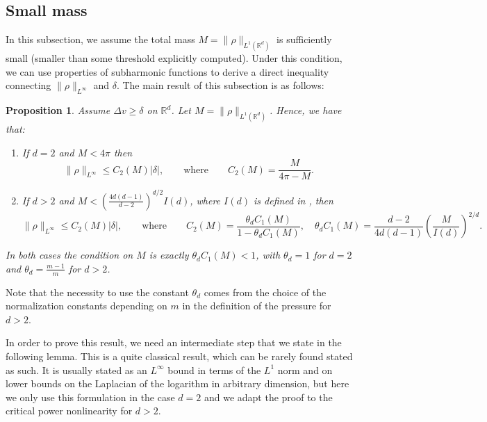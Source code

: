 \documentclass[11pt,a4paper]{article}
\numberwithin{equation}{section}
\theoremstyle{plain}
\newtheorem{proposition}[theorem]{Proposition}
\theoremstyle{remark}
\newcommand {\f}{\frac}
\begin{document}
\subsection{Small mass}

In this subsection, we assume the total mass $M = \|\rho\|_{L^1(\mathbb{R}^d)}$ is sufficiently small (smaller than some threshold explicitly computed). Under this condition, we can use properties of subharmonic functions to derive a direct inequality connecting $\|\rho\|_{L^\infty}$ and $\delta$. The main result of this subsection is as follows:

\begin{proposition}\label{prop:linf_very_small_mass}
Assume $\Delta v \ge \delta$ on $\mathbb{R}^d$. Let $M=\|\rho\|_{L^{1}(\mathbb{R}^d)}$. Hence, we have that:
\begin{enumerate}
\item If $d=2$ and $M < 4\pi$ then
$$
    \|\rho\|_{L^{\infty}}\le C_2(M)|\delta|,
    \qquad\text{where}\qquad
    C_2(M) = \f{M}{4\pi-M}.
$$
\item If $d>2$ and $M < \left(\f{4d(d-1)}{d-2}\right)^{d/2}I(d)$, where $I(d)$ is defined in , then
$$
    \|\rho\|_{L^{\infty}}\le C_2(M)|\delta|,
    \qquad\text{where}\qquad
    C_2(M) = \f{\theta_d C_1(M)}{1-\theta_d C_1(M)},
    \quad
    \theta_d C_1(M) = \f{d-2}{4d(d-1)}\left(\f{M}{I(d)}\right)^{2/d}.
$$
\end{enumerate}
In both cases the condition on $M$ is exactly $\theta_d C_1(M)<1$, with $\theta_d=1$ for $d=2$ and $\theta_d=\f{m-1}{m}$ for $d>2$.
\end{proposition}
Note that the necessity to use the constant $\theta_d$ comes from the choice of the normalization constants depending on $m$ in the definition of the pressure for $d>2$.

In order to prove this result, we need an intermediate step that we state in the  following lemma. This is a quite classical result, which can be rarely found stated as such. It is usually stated as an $L^\infty$ bound in terms of the $L^1$ norm and on lower bounds on the Laplacian of the logarithm in arbitrary dimension, but here we only use this formulation in the case $d=2$ and we adapt the proof to the critical power nonlinearity for $d>2$.
 
\end{document}
